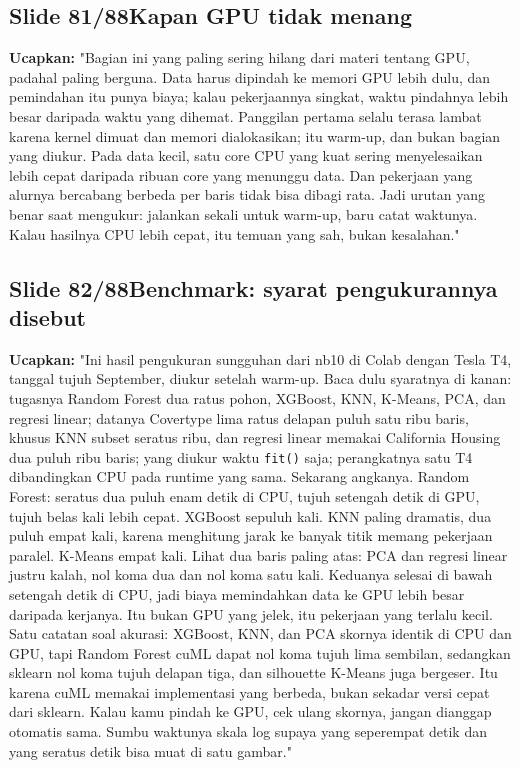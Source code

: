 \documentclass[11pt]{article}
\renewcommand{\framebox}[1]{\colorbox{acc!15}{\textcolor{acc}{\textbf{#1}}}}
\begin{document}
\subsection*{\framebox{Slide 81/88}\quad Kapan GPU tidak menang}
\textbf{Ucapkan:} "Bagian ini yang paling sering hilang dari materi tentang GPU, padahal paling berguna. Data harus dipindah ke memori GPU lebih dulu, dan pemindahan itu punya biaya; kalau pekerjaannya singkat, waktu pindahnya lebih besar daripada waktu yang dihemat. Panggilan pertama selalu terasa lambat karena kernel dimuat dan memori dialokasikan; itu warm-up, dan bukan bagian yang diukur. Pada data kecil, satu core CPU yang kuat sering menyelesaikan lebih cepat daripada ribuan core yang menunggu data. Dan pekerjaan yang alurnya bercabang berbeda per baris tidak bisa dibagi rata. Jadi urutan yang benar saat mengukur: jalankan sekali untuk warm-up, baru catat waktunya. Kalau hasilnya CPU lebih cepat, itu temuan yang sah, bukan kesalahan."\\[2pt]

\subsection*{\framebox{Slide 82/88}\quad Benchmark: syarat pengukurannya disebut}
\textbf{Ucapkan:} "Ini hasil pengukuran sungguhan dari nb10 di Colab dengan Tesla T4, tanggal tujuh September, diukur setelah warm-up. Baca dulu syaratnya di kanan: tugasnya Random Forest dua ratus pohon, XGBoost, KNN, K-Means, PCA, dan regresi linear; datanya Covertype lima ratus delapan puluh satu ribu baris, khusus KNN subset seratus ribu, dan regresi linear memakai California Housing dua puluh ribu baris; yang diukur waktu \texttt{fit()} saja; perangkatnya satu T4 dibandingkan CPU pada runtime yang sama. Sekarang angkanya. Random Forest: seratus dua puluh enam detik di CPU, tujuh setengah detik di GPU, tujuh belas kali lebih cepat. XGBoost sepuluh kali. KNN paling dramatis, dua puluh empat kali, karena menghitung jarak ke banyak titik memang pekerjaan paralel. K-Means empat kali. Lihat dua baris paling atas: PCA dan regresi linear justru kalah, nol koma dua dan nol koma satu kali. Keduanya selesai di bawah setengah detik di CPU, jadi biaya memindahkan data ke GPU lebih besar daripada kerjanya. Itu bukan GPU yang jelek, itu pekerjaan yang terlalu kecil. Satu catatan soal akurasi: XGBoost, KNN, dan PCA skornya identik di CPU dan GPU, tapi Random Forest cuML dapat nol koma tujuh lima sembilan, sedangkan sklearn nol koma tujuh delapan tiga, dan silhouette K-Means juga bergeser. Itu karena cuML memakai implementasi yang berbeda, bukan sekadar versi cepat dari sklearn. Kalau kamu pindah ke GPU, cek ulang skornya, jangan dianggap otomatis sama. Sumbu waktunya skala log supaya yang seperempat detik dan yang seratus detik bisa muat di satu gambar."\\[2pt]
\end{document}
